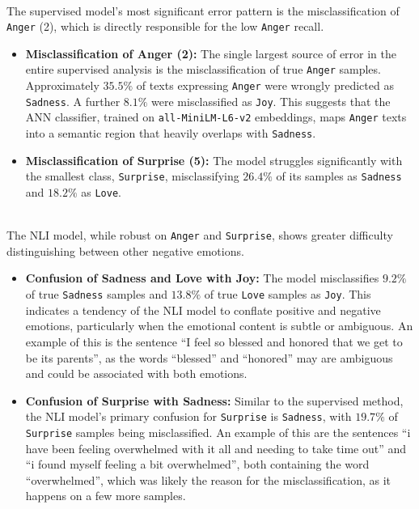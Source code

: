 \documentclass[runningheads]{llncs}
\begin{document}
\noindent
\\
The supervised model's most significant error pattern is the misclassification of \texttt{Anger} (2), which is directly responsible for the low \texttt{Anger} recall.
\begin{itemize}
    \item \textbf{Misclassification of Anger (2):} The single largest source of error in the entire supervised analysis is the misclassification of true \texttt{Anger} samples. Approximately $35.5\%$ of texts expressing \texttt{Anger} were wrongly predicted as \texttt{Sadness}. A further $8.1\%$ were misclassified as \texttt{Joy}. This suggests that the ANN classifier, trained on \texttt{all-MiniLM-L6-v2} embeddings, maps \texttt{Anger} texts into a semantic region that heavily overlaps with \texttt{Sadness}.
    \item \textbf{Misclassification of Surprise (5):} The model struggles significantly with the smallest class, \texttt{Surprise}, misclassifying $26.4\%$ of its samples as \texttt{Sadness} and $18.2\%$ as \texttt{Love}.
\end{itemize}

\noindent
\\
The NLI model, while robust on \texttt{Anger} and \texttt{Surprise}, shows greater difficulty distinguishing between other negative emotions.
\begin{itemize}
    \item \textbf{Confusion of Sadness and Love with Joy:} The model misclassifies $9.2\%$ of true \texttt{Sadness} samples and $13.8\%$ of true \texttt{Love} samples as \texttt{Joy}. This indicates a tendency of the NLI model to conflate positive and negative emotions, particularly when the emotional content is subtle or ambiguous. An example of this is the sentence ``I feel so blessed and honored that we get to be its parents'', as the words ``blessed'' and ``honored'' may are ambiguous and could be associated with both emotions.
    \item \textbf{Confusion of Surprise with Sadness:} Similar to the supervised method, the NLI model's primary confusion for \texttt{Surprise} is \texttt{Sadness}, with $19.7\%$ of \texttt{Surprise} samples being misclassified. An example of this are the sentences ``i have been feeling overwhelmed with it all and needing to take time out'' and ``i found myself feeling a bit overwhelmed'', both containing the word ``overwhelmed'', which was likely the reason for the misclassification, as it happens on a few more samples.

\end{itemize}
\end{document}
